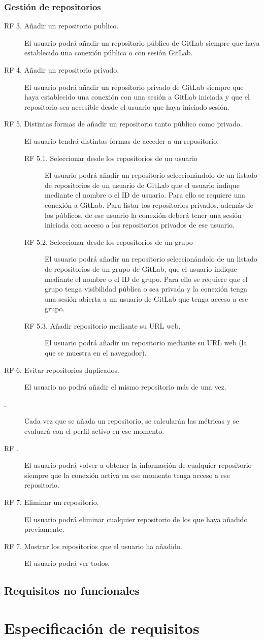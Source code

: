 \subsubsection{Gestión de repositorios}
\begin{description}
	\item[RF 3. Añadir un repositorio publico.] El usuario podrá añadir un repositorio público de GitLab siempre que haya establecido una conexión pública o con sesión  GitLab.
	\item[RF 4. Añadir un repositorio privado.] El usuario podrá añadir un repositorio privado de GitLab siempre que haya establecido una conexión con una sesión a GitLab iniciada y que el repositorio sea accesible desde el usuario que haya iniciado sesión.
	\item[RF 5. Distintas formas de añadir un repositorio tanto público como privado.] El usuario tendrá distintas formas de acceder a un repositorio.
	\begin{description}
		\item[RF 5.1. Seleccionar desde los repositorios de un usuario] El usuario podrá añadir un repositorio seleccionándolo de un listado de repositorios de un usuario de GitLab que el usuario indique mediante el nombre o el ID de usuario. Para ello se requiere una conexión a GitLab. Para listar los repositorios privados, además de los públicos, de ese usuario la conexión deberá tener una sesión iniciada con acceso a los repositorios privados de ese usuario.
		\item[RF 5.2. Seleccionar desde los repositorios de un grupo] El usuario podrá añadir un repositorio seleccionándolo de un listado de repositorios de un grupo de GitLab, que el usuario indique mediante el nombre o el ID de grupo. Para ello se requiere que el grupo tenga visibilidad pública o sea privada y la conexión tenga una sesión abierta a un usuario de GitLab que tenga acceso a ese grupo.
		\item[RF 5.3. Añadir repositorio mediante su URL web.] El usuario podrá añadir un repositorio mediante su URL web (la que se muestra en el navegador).
	\end{description}
	\item[RF 6. Evitar repositorios duplicados.] El usuario no podrá añadir el mismo repositorio más de una vez.
	\item[.] Cada vez que se añada un repositorio, se calcularán las métricas y se evaluará con el perfil activo en ese momento.
	\item[RF . ] El usuario podrá volver a obtener la información de cualquier repositorio siempre que la conexión activa en ese momento tenga acceso a ese repositorio.
	\item[RF 7. Eliminar un repositorio.] El usuario podrá eliminar cualquier repositorio de los que haya añadido previamente.
	\item[RF 7. Mostrar los repositorios que el usuario ha añadido.] El usuario podrá ver todos.
\end{description}
\subsection{Requisitos no funcionales}
\section{Especificación de requisitos}

